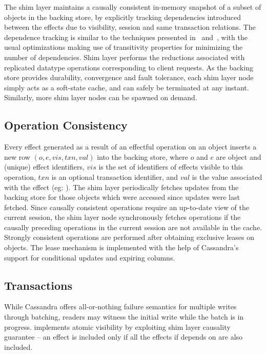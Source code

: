 The shim layer maintains a causally consistent in-memory snapshot of a subset
of objects in the backing store, by explicitly tracking dependencies introduced
between the effects due to visibility, session and same transaction relations.
The dependence tracking is similar to the techniques presented in~\cite{BoltOn}
and~\cite{Eiger}, with the usual optimizations making use of transitivity
properties for minimizing the number of dependencies. Shim layer performs the
reductions associated with replicated datatype operations corresponding to
client requests. As the backing store provides durability, convergence and
fault tolerance, each shim layer node simply acts as a soft-state cache, and
can safely be terminated at any instant. Similarly, more shim layer nodes can
be spawned on demand.

\subsection{Operation Consistency}

Every effect generated as a result of an effectful operation on an object
inserts a new row $(o,e,vis,txn,val)$ into the backing store, where $o$ and $e$
are object and (unique) effect identifiers, $vis$ is the set of identifiers of
effects visible to this operation, $txn$ is an optional transaction identifier,
and $val$ is the value associated with the effect (eg: ). The
shim layer periodically fetches updates from the backing store for those objects
which were accessed since updates were last fetched. Since causally consistent
operations require an up-to-date view of the current session, the shim layer
node synchronously fetches operations if the causally preceding operations in
the current session are not available in the cache.  Strongly consistent
operations are performed after obtaining exclusive leases on objects. The lease
mechanism is implemented with the help of Cassandra's support for conditional
updates and expiring columns.

\subsection{Transactions}

While Cassandra offers all-or-nothing failure semantics for multiple writes
through batching, readers may witness the initial write while the batch is in
progress. \quelea implements atomic visibility by exploiting shim layer causality
guarantee -- an effect is included only if all the effects if depends on are
also included.

